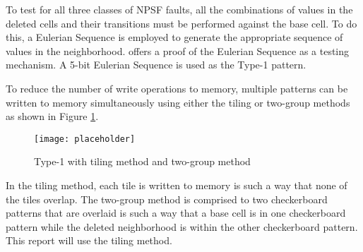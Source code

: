 To test for all three classes of NPSF faults, all the combinations of values in the deleted cells and their transitions must be performed against the base cell.  To do this, a Eulerian Sequence is employed to generate the appropriate sequence of values in the neighborhood.  \cite{1675556} offers a proof of the Eulerian Sequence as a testing mechanism.  A 5-bit Eulerian Sequence is used as the Type-1 pattern.

To reduce the number of write operations to memory, multiple patterns can be written to memory simultaneously using either the tiling or two-group methods as shown in Figure \ref{fig:type1methods}.

\begin{figure}[h]
  \centering
  \texttt{[image: placeholder]}
  \caption{Type-1 with tiling method and two-group method}
  \label{fig:type1methods}
\end{figure}

In the tiling method, each tile is written to memory is such a way that none of the tiles overlap.  The two-group method is comprised to two checkerboard patterns that are overlaid is such a way that a base cell is in one checkerboard pattern while the deleted neighborhood is within the other checkerboard pattern.  This report will use the tiling method.
